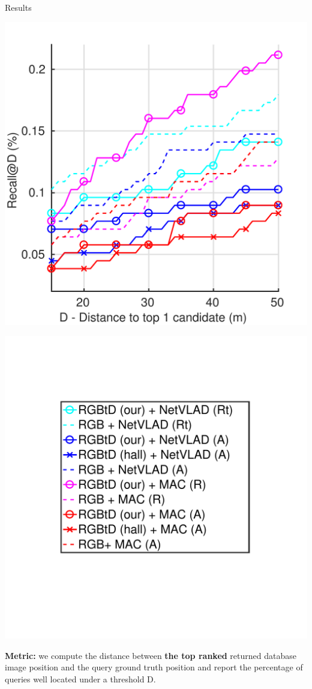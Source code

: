 \documentclass[final]{beamer}
\newlength{\colwidth}
\begin{document}
\begin{frame}[t]
\begin{columns}[t]
\begin{column}{\colwidth}
\begin{block}{Results}
\begin{minipage}{0.49\linewidth}
			\includegraphics[width=\linewidth]{vect/res/night}
		\end{minipage}
		
		\begin{minipage}{0.49\linewidth}
     		\centering
			\includegraphics[trim={90 140 95 100},clip,width=0.7\linewidth]{vect/res/legend}	\hfill
		\end{minipage}\hfill
		\begin{minipage}{0.49\linewidth}
			\textbf{Metric:} we compute the distance between \textbf{the top ranked} returned database image position and the query ground truth position and report the percentage of queries well located under a threshold D.
		\end{minipage}
  \end{block}
  

\end{column}
\end{columns}
\end{frame}
\end{document}
